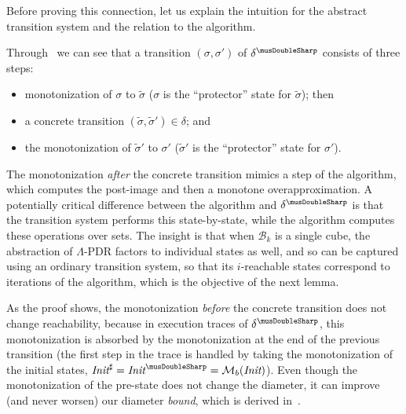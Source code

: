\documentclass[acmsmall,screen]{acmart}
\newcommand{\Init}{{\textit{Init}}}
\newcommand{\tr}{\delta}
\newcommand{\bkwrch}[1]{\mathcal{B}_{#1}}
\newcommand{\monox}[2]{\mathcal{M}_{#2}({#1})}
\newcommand{\abs}[1]{{#1}^{\sharp}}
\newcommand{\absr}[1]{{#1}^{\musDoubleSharp}}
\begin{document}
Before proving this connection, let us explain the intuition for the abstract transition system and the relation to the algorithm.

%
Through~ we can see that a transition $(\sigma,\sigma')$ of $\absr{\tr}$ consists of three steps:
\begin{itemize}
	\item monotonization of $\sigma$ to $\widetilde{\sigma}$ %
($\sigma$ is the ``protector'' state for $\widetilde{\sigma}$); then
	\item a concrete transition $(\widetilde{\sigma},\widetilde{\sigma}') \in \tr$; and
	\item the monotonization of $\widetilde{\sigma}'$ to $\sigma'$ %
($\widetilde{\sigma}'$ is the ``protector'' state for $\sigma'$).
\end{itemize}

The monotonization \emph{after} the concrete transition mimics a step of the algorithm, which computes the post-image and then a monotone overapproximation.
A potentially critical difference between the algorithm and $\absr{\tr}$ is that the transition system performs this state-by-state, while the algorithm computes these operations over sets. The insight is that when $\bkwrch{k}$ is a single cube, the abstraction of $\Lambda$-PDR factors to individual states as well, and so can be captured using an ordinary transition system, so that its $i$-reachable states correspond to iterations of the algorithm, which is the objective of the next lemma.

%
As the proof shows, the monotonization \emph{before} the concrete transition does not change reachability, because in execution traces of $\absr{\tr}$, this monotonization is absorbed by the monotonization at the end of the previous transition (the first step in the trace is handled by taking the monotonization of the initial states, $\abs{\Init}=\absr{\Init}=\monox{\Init}{b}$).
Even though the monotonization of the pre-state does not change the diameter, it can improve (and never worsen) our diameter \emph{bound}, which is derived in~.

%
%
%
%
%
%
%
%
%
\end{document}
